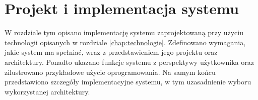\chapter{Projekt i implementacja systemu}
\label{sec:implementacja-systemu}
W rozdziale tym opisano implementację systemu zaprojektowaną przy użyciu technologii opisanych w rozdziale \ref{chap:technologie}. Zdefinowano wymagania, jakie system ma spełniać, wraz z przedstawieniem jego projektu oraz architektury. Ponadto ukazano funkcje systemu z perspektywy użytkownika oraz zilustrowano przykładowe użycie oprogramowania. Na samym końcu przedstawiono szczegóły implementacyjne systemu, w tym uzasadnienie wyboru wykorzystanej architektury. 





